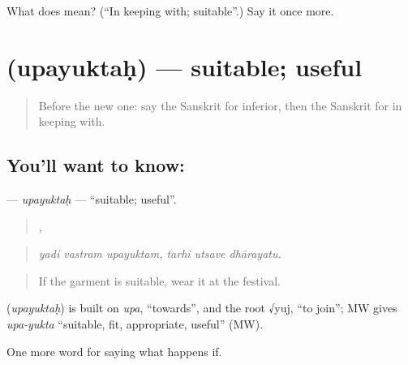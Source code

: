 \begin{tcolorbox}[breakable,colback=teal!4,colframe=teal!35!black,title={Before you move on}]
What does  mean? (\textquotedblleft{}In keeping with; suitable\textquotedblright{}.) Say it once more.
\end{tcolorbox}
\section[\texorpdfstring{\sk{उपयुक्तः} (upayuktaḥ)}{उपयुक्तः (upayuktaḥ)}]{ (upayuktaḥ) — suitable; useful}

\label{lesson:SA-C391-upayuktah}



\begin{quote}
Before the new one: say the Sanskrit for inferior, then the Sanskrit for in keeping with.
\end{quote}

\subsection*{You'll want to know: }
\textbf{} — \emph{upayuktaḥ} — \textquotedblleft{}suitable; useful\textquotedblright{}.

\begin{quote}
  ,   
\end{quote}

\begin{quote}
\emph{yadi vastram upayuktam, tarhi utsave dhārayatu.}
\end{quote}

\begin{quote}
If the garment is suitable, wear it at the festival.
\end{quote}

\begin{cousinweb}
\textbf{} (\emph{upayuktaḥ}) is built on \emph{upa}, \textquotedblleft{}towards\textquotedblright{}, and the root √yuj, \textquotedblleft{}to join\textquotedblright{}; MW gives \emph{upa-yukta} \textquotedblleft{}suitable, fit, appropriate, useful\textquotedblright{} (MW).
\end{cousinweb}

\begin{grammarlens}[title={What you've built}]
One more word for saying what happens if.
\end{grammarlens}

